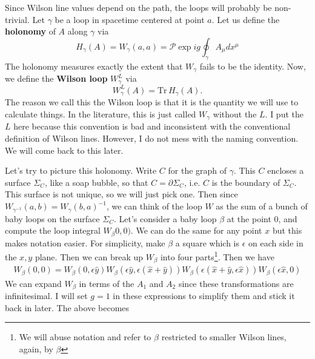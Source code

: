 \documentclass[main.tex]{subfiles}
\begin{document}
Since Wilson line values depend on the path, the loops will probably be non-trivial. Let $\gamma$ be a loop in spacetime centered at point $a$. Let us define the \textbf{holonomy} of $A$ along $\gamma$ via
\[
H_\gamma (A) = W_\gamma (a,a) = \mathcal{P} \exp{ig \oint_\gamma A_\mu dx^\mu}
\]
The holonomy measures exactly the extent that $W_\gamma$ fails to be the identity. Now, we define the \textbf{Wilson loop} $W^L_\gamma$ via
\[
W^L_\gamma (A) = \text{Tr}\, H_\gamma (A).
\]
The reason we call this the Wilson loop is that it is the quantity we will use to calculate things. In the literature, this is just called $W_\gamma$ without the $L$. I put the $L$ here because this convention is bad and inconsistent with the conventional definition of Wilson lines. However, I do not mess with the naming convention. We will come back to this later.

Let's try to picture this holonomy. Write $C$ for the graph of $\gamma$. This $C$ encloses a surface $\Sigma_C$, like a soap bubble, so that $C = \partial \Sigma_C$, i.e. $C$ is the boundary of $\Sigma_C$. This surface is not unique, so we will just pick one. Then since $W_{\gamma^{-1}} (a,b) = W_\gamma (b,a)^{-1}$, we can think of the loop $W$ as the sum of a bunch of baby loops on the surface $\Sigma_C$. Let's consider a baby loop $\beta$ at the point $0$, and compute the loop integral $W_\beta 0,0)$. We can do the same for any point $x$ but this makes notation easier. For simplicity, make $\beta$ a square which is $\epsilon$ on each side in the $x,y$ plane. Then we can break up $W_\beta$ into four parts\footnote{We will abuse notation and refer to $\beta$ restricted to smaller Wilson lines, again, by $\beta$}. Then we have
\begin{align*}
W_\beta(0,0) = 
W_\beta(0,\epsilon \hat{y})
W_\beta(\epsilon \hat{y},\epsilon(\hat{x} + \hat{y}))
W_\beta(\epsilon(\hat{x} + \hat{y},\epsilon \hat{x}))
W_\beta(\epsilon \hat{x},0)
\end{align*}
We can expand $W_\beta$ in terms of the $A_1$ and $A_2$ since these transformations are infinitesimal. I will set $g = 1$ in these expressions to simplify them and stick it back in later. The above becomes
\end{document}
